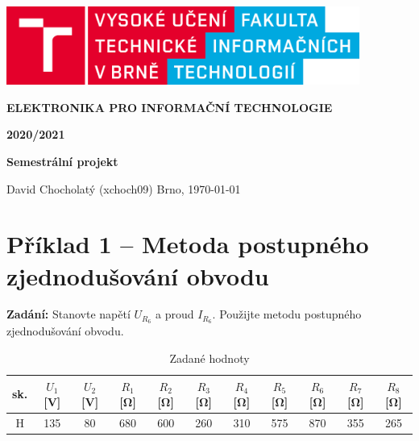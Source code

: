 \documentclass[a4paper]{article}
\begin{document}
    \begin{titlepage}
        \begin{center}
            \includegraphics[width=0.87\textwidth]{images/logo_cz.png}
            \vspace*{6cm}

            \Large
            \textbf{ELEKTRONIKA PRO INFORMAČNÍ TECHNOLOGIE}    
            
            \vspace{0.5cm}
            \Large
            \textbf{2020/2021}
            
            \vspace{2cm}
            
            \Large
            \textbf{Semestrální projekt}
            
           \vfill
		   \begin{flushleft} 
		   \large
		   David Chocholatý (xchoch09)
		   \hfill
		   Brno, \today
		   \end{flushleft}
            
        \end{center}
    \end{titlepage}

\pagestyle{fancy}

\newpage
\tableofcontents
\newpage

\section{Příklad 1 -- Metoda postupného zjednodušování obvodu}
\textbf{Zadání:} Stanovte napětí $U_{R_6}$ a proud $I_{R_6}$. Použijte metodu postupného zjednodušování obvodu.

\begin{table}[ht]
  \begin{center}
    \begin{tabular}{|c|c|c|c|c|c|c|c|c|c|c|} 
      \hline
       sk. & $U_1$ [\si{\volt}] & $U_2$ [\si{\volt}] & $R_1$ [\si{\ohm}] & $R_2$ [\si{\ohm}]
       & $R_3$ [\si{\ohm}] & $R_4$ [\si{\ohm}] & $R_5$ [\si{\ohm}]
       & $R_6$ [\si{\ohm}] & $R_7$ [\si{\ohm}] & $R_8$ [\si{\ohm}]\\
       \hline
       H & 135 & 80 & 680 & 600 & 260 & 310 & 575 & 870 & 355 & 265 \\
     \hline
    \end{tabular}
    \caption{Zadané hodnoty}
    \label{tab:1}
  \end{center}
 \end{table}
\end{document}

